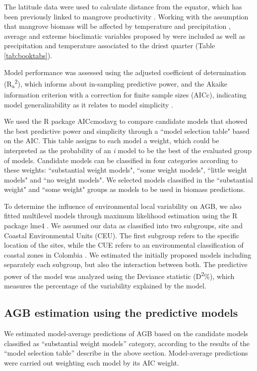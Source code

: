 \documentclass[review, authoryear]{elsarticle}   	%
\begin{document}
The latitude data were used to calculate distance from the equator, which has been previously linked to mangrove productivity \citep{Twilley1992, Saenger1993, Komiyama2008128, Wang2013539, Alongi2014}.  Working with the assumption that mangrove biomass will be affected by temperature and precipitation \citep{Komiyama2008128, CONL:CONL12060}, average and extreme bioclimatic variables proposed by \citet{CONL:CONL12060} were included as well as precipitation and temperature associated to the driest quarter (Table \ref{tab:booktabs}). 

Model performance was assessed using the adjusted coefficient of determination (R\textsubscript{a}\textsuperscript{2}), which informs about in-sampling predictive power, and the Akaike information criterion with a correction for finite sample sizes (AICc), indicating model generalizability as it relates to model simplicity \citep{1748-9326-9-10-104013}.

We used the R package AICcmodavg \citep{Mazerolle:2015aa} to compare candidate models that showed the best predictive power and simplicity through a ``model selection table" based on the AIC. This table assigns to each model a weight, which could be interpreted as the probability of an  \emph{i} model to be the best of the evaluated group of models. %
Candidate models can be classified in four categories according to these weights: ``substantial weight models", ``some weight models", ``little weight models" and ``no weight models". We selected models classified in the ``substantial weight"  and ``some weight" groups as models to be used in biomass predictions.  

To determine the influence of environmental local variability on AGB, we also fitted multilevel models through maximum likelihood estimation using the R package lme4 \citep{Bates:2015aa}. We assumed our data as classified into two subgroups, site and Coastal Environmental Units (CEU). The first subgroup refers to the specific location of the sites, while the CUE refers to an environmental classification of coastal zones in Colombia \citep{CCO_UAC}. We estimated the initially proposed models including separately each subgroup, but also the interaction between both. The predictive power of the model was analyzed using the Deviance statistic (D\textsuperscript{2}\%), which measures the percentage of the variability explained by the model. 

\subsection {AGB estimation using the predictive models}
We estimated model-average predictions of AGB based on the candidate models classified as ``substantial weight models'' category, according to the results of the ``model selection table'' describe in the above section. Model-average predictions were carried out weighting each model by its AIC weight. 
\end{document}
